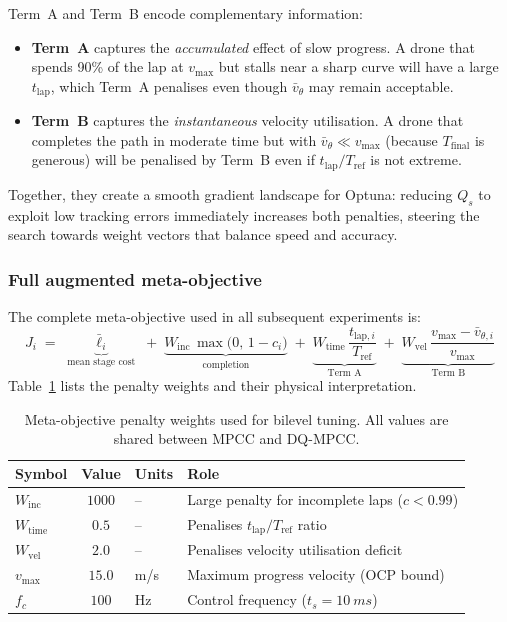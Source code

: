 Term~A and Term~B encode complementary information:
%
\begin{itemize}
  \item \textbf{Term~A} captures the \emph{accumulated} effect
    of slow progress.  A drone that spends 90\% of the lap at
    $v_{\max}$ but stalls near a sharp curve will have a large
    $t_{\text{lap}}$, which Term~A penalises even though
    $\bar{v}_\theta$ may remain acceptable.
  \item \textbf{Term~B} captures the \emph{instantaneous} velocity
    utilisation.  A drone that completes the path in moderate
    time but with $\bar{v}_\theta \ll v_{\max}$ (because
    $T_{\text{final}}$ is generous) will be penalised by
    Term~B even if $t_{\text{lap}} / T_{\text{ref}}$ is not
    extreme.
\end{itemize}
%
Together, they create a smooth gradient landscape for Optuna:
reducing $Q_s$ to exploit low tracking errors immediately
increases both penalties, steering the search towards weight
vectors that balance speed and accuracy.

\subsubsection{Full augmented meta-objective}

The complete meta-objective used in all subsequent experiments is:
%
\begin{equation}
  \boxed{
  J_i
  \;=\;
  \underbrace{\bar\ell_i}_{\text{mean stage cost}}
  \;+\;
  \underbrace{W_{\text{inc}}\,\max\!\bigl(0,\,1-c_i\bigr)}_{\text{completion}}
  \;+\;
  \underbrace{W_{\text{time}}\,
    \frac{t_{\text{lap},i}}{T_{\text{ref}}}
  }_{\text{Term A}}
  \;+\;
  \underbrace{W_{\text{vel}}\,
    \frac{v_{\max} - \bar{v}_{\theta,i}}{v_{\max}}
  }_{\text{Term B}}
  }
  \label{eq:J_augmented}
\end{equation}
%
Table~\ref{tab:penalty_weights} lists the penalty weights
and their physical interpretation.

\begin{table}[t]
  \centering
  \caption{Meta-objective penalty weights used for bilevel tuning.
           All values are shared between MPCC and DQ-MPCC.}
  \label{tab:penalty_weights}
  \setlength{\tabcolsep}{5pt}
  \begin{tabular}{lcll}
    \toprule
    Symbol & Value & Units & Role \\
    \midrule
    $W_{\text{inc}}$  & $1000$  & -- &
      Large penalty for incomplete laps ($c < 0.99$) \\
    $W_{\text{time}}$ & $0.5$   & -- &
      Penalises $t_{\text{lap}} / T_{\text{ref}}$ ratio \\
    $W_{\text{vel}}$  & $2.0$   & -- &
      Penalises velocity utilisation deficit \\
    $v_{\max}$        & $15.0$  & m/s &
      Maximum progress velocity (OCP bound) \\
    $f_c$             & $100$   & Hz &
      Control frequency ($t_s = \SI{10}{ms}$) \\
    \bottomrule
  \end{tabular}
\end{table}


